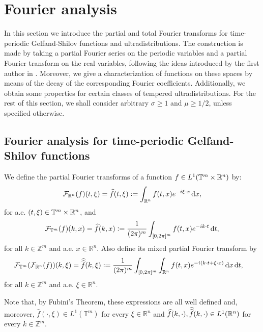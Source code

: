 \documentclass[11pt,reqno]{amsart}
\numberwithin{equation}{section}
\theoremstyle{definition}
\theoremstyle{definition}
\newcommand{\T}{\mathbb{T}}
\newcommand{\G}{\mathnormal{\mathbb{T}^{m}\times\mathbb{R}^n}}
\newcommand{\R}{\mathbb{R}}
\newcommand{\Z}{\mathbb{Z}}
\DeclareMathOperator{\ftil}{\widehat{\widehat{\mathnormal{f}\,}}\!\!\,}
\newcommand{\defeq}{\vcentcolon=}
\begin{document}
\section{Fourier analysis}\label{sec_Fourier}

	In this section we introduce the partial and total Fourier transforms for time-periodic Gelfand-Shilov functions and ultradistributions. The construction is made by taking a partial Fourier series on the periodic variables and a partial Fourier transform on the real variables, following the ideas introduced by the first author in \cite{KowTmRn}. Moreover, we give a characterization of functions on these spaces by means of the decay of the corresponding Fourier coefficients. Additionally, we obtain some properties for certain classes of tempered ultradistributions. For the rest of this section, we shall consider arbitrary $\sigma\geq 1$ and $\mu\geq 1/2$, unless specified otherwise.

    \subsection{Fourier analysis for time-periodic Gelfand-Shilov functions}
     
    We define the partial Fourier transforms of a function $f\in L^1(\G)$ by:
    \[\mathcal{F}_{\R^n}(f)(t,\xi)=\widehat{f}(t,\xi)\defeq \int_{\R^n}f(t,x)e^{-i\xi\cdot x }\,\mathrm{d}x,\]
    for a.e. $(t,\xi)\in \G$, and
    \[\mathcal{F}_{\T^m}(f)(k,x)=\widehat{f}(k,x)\defeq \frac{1}{(2\pi)^m}\int_{[0,2\pi]^m}f(t,x)e^{-ik\cdot t}\,\mathrm{d}t,\]
     for all $k\in\Z^m$ and a.e. $x\in\R^n$. Also define its mixed partial Fourier transform by
     \begin{align*}
         \mathcal{F}_{\T^m}(\mathcal{F}_{\R^n}(f))(k,\xi) = \ftil(k,\xi)&\defeq\frac{1}{(2\pi)^m}\int_{[0,2\pi]^m}\int_{\R^n}f(t,x)e^{-i(k\cdot t+\xi\cdot x )}\,\mathrm{d}x\,\mathrm{d}t,
    \end{align*}
     for all $k\in\Z^m$ and a.e. $\xi\in\R^n$.
     
     Note that, by Fubini's Theorem, these expressions are all well defined and, moreover, $\widehat{f}(\cdot,\xi)\in L^1(\T^m)$ for every $\xi\in\R^n$ and $\widehat{f}(k,\cdot),\ftil(k,\cdot)\in L^1(\R^n)$ for every $k\in\Z^m$. 
\end{document}
